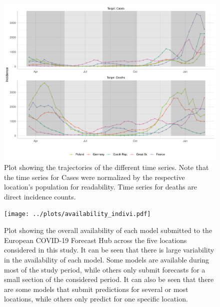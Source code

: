 \begin{figure}
\includegraphics[width = \textwidth]{../plots/trajectories.pdf}
\caption{Plot showing the trajectories of the different time series. Note that the time series for Cases were normalized by the respective location's population for readability. Time series for deaths are direct incidence counts.}
\label{fig:trajectories}
\end{figure}
\begin{figure}
\texttt{[image: ../plots/availability\_indivi.pdf]}
\caption{Plot showing the overall availability of each model submitted to the European COVID-19 Forecast Hub across the five locations considered in this study. It can be seen that there is large variability in the availability of each model. Some models are available during most of the study period, while others only submit forecasts for a small section of the considered period. It can also be seen that there are some models that submit predictions for several or most locations, while others only predict for one specific location.}
\end{figure}
